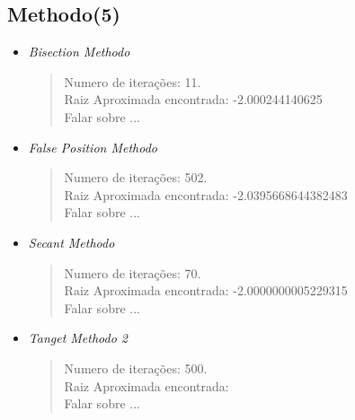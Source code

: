 \documentclass[12pt]{article}
\begin{document}
\subsection{Methodo(5)}
\begin{itemize}
    \item \textit{Bisection Methodo}\\
        \begin{verse}
          Numero de iterações: 11.\\
          Raiz Aproximada encontrada: -2.000244140625\\
          Falar sobre ...
        \end{verse}
    \item \textit{False Position Methodo}
        \begin{verse}
          Numero de iterações: 502.\\
          Raiz Aproximada encontrada: -2.0395668644382483\\
          Falar sobre ...
        \end{verse}
    \item \textit{Secant Methodo}
        \begin{verse}
          Numero de iterações: 70.\\
          Raiz Aproximada encontrada: -2.0000000005229315\\
          Falar sobre ...
        \end{verse}
    \item \textit{Tanget Methodo 2}
        \begin{verse}
          Numero de iterações: 500.\\
          Raiz Aproximada encontrada: \\
          Falar sobre ...
        \end{verse}
\end{itemize}
\end{document}
